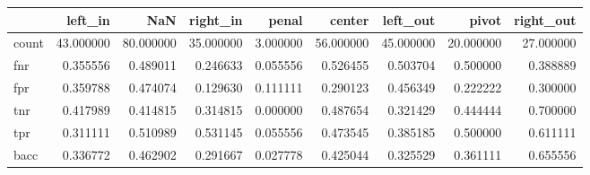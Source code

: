 \begin{tabular}{lrrrrrrrr}
\toprule
{} &    left\_in &        NaN &   right\_in &     penal &     center &   left\_out &      pivot &  right\_out \\
\midrule
count &  43.000000 &  80.000000 &  35.000000 &  3.000000 &  56.000000 &  45.000000 &  20.000000 &  27.000000 \\
fnr   &   0.355556 &   0.489011 &   0.246633 &  0.055556 &   0.526455 &   0.503704 &   0.500000 &   0.388889 \\
fpr   &   0.359788 &   0.474074 &   0.129630 &  0.111111 &   0.290123 &   0.456349 &   0.222222 &   0.300000 \\
tnr   &   0.417989 &   0.414815 &   0.314815 &  0.000000 &   0.487654 &   0.321429 &   0.444444 &   0.700000 \\
tpr   &   0.311111 &   0.510989 &   0.531145 &  0.055556 &   0.473545 &   0.385185 &   0.500000 &   0.611111 \\
bacc  &   0.336772 &   0.462902 &   0.291667 &  0.027778 &   0.425044 &   0.325529 &   0.361111 &   0.655556 \\
\bottomrule
\end{tabular}
